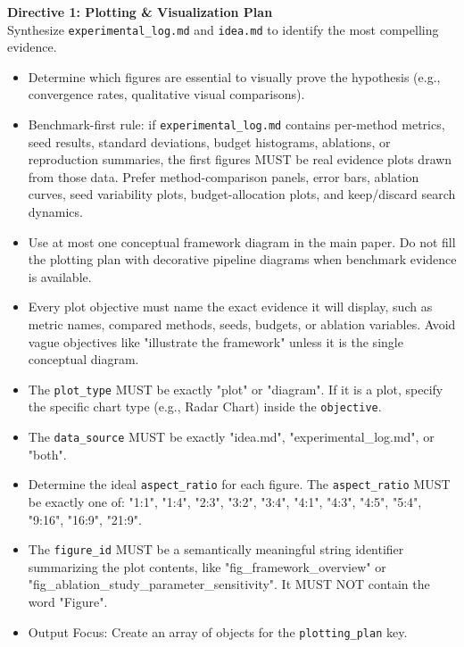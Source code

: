 \vspace{1em}
\noindent\textbf{Directive 1: Plotting \& Visualization Plan}\\
\vspace{0.5em}
Synthesize \texttt{experimental\_log.md} and \texttt{idea.md} to identify the most compelling evidence.
\begin{itemize}
    \item Determine which figures are essential to visually prove the hypothesis (e.g., convergence rates, qualitative visual comparisons).
    \item Benchmark-first rule: if \texttt{experimental\_log.md} contains per-method metrics, seed results, standard deviations, budget histograms, ablations, or reproduction summaries, the first figures MUST be real evidence plots drawn from those data. Prefer method-comparison panels, error bars, ablation curves, seed variability plots, budget-allocation plots, and keep/discard search dynamics.
    \item Use at most one conceptual framework diagram in the main paper. Do not fill the plotting plan with decorative pipeline diagrams when benchmark evidence is available.
    \item Every plot objective must name the exact evidence it will display, such as metric names, compared methods, seeds, budgets, or ablation variables. Avoid vague objectives like "illustrate the framework" unless it is the single conceptual diagram.
    \item The \texttt{plot\_type} MUST be exactly "plot" or "diagram". If it is a plot, specify the specific chart type (e.g., Radar Chart) inside the \texttt{objective}.
    \item The \texttt{data\_source} MUST be exactly "idea.md", "experimental\_log.md", or "both".
    \item Determine the ideal \texttt{aspect\_ratio} for each figure. The \texttt{aspect\_ratio} MUST be exactly one of: "1:1", "1:4", "2:3", "3:2", "3:4", "4:1", "4:3", "4:5", "5:4", "9:16", "16:9", "21:9".
    \item The \texttt{figure\_id} MUST be a semantically meaningful string identifier summarizing the plot contents, like "fig\_framework\_overview" or "fig\_ablation\_study\_parameter\_sensitivity". It MUST NOT contain the word "Figure".
    \item Output Focus: Create an array of objects for the \texttt{plotting\_plan} key.
\end{itemize}


